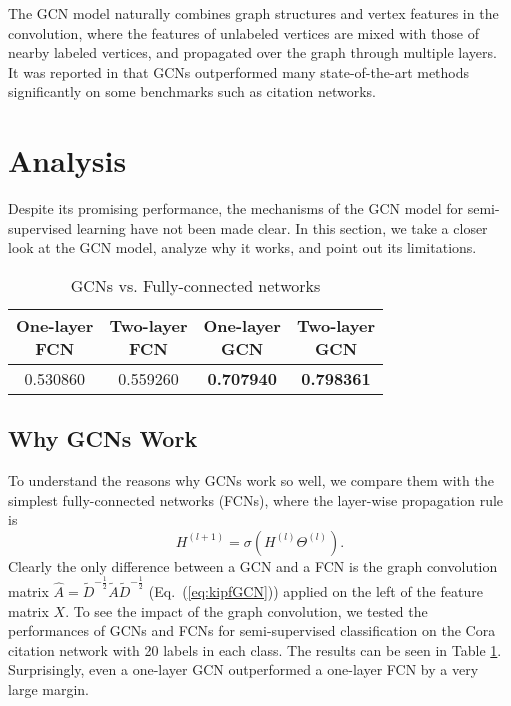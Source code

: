 \documentclass[letterpaper]{article} \usepackage{aaai18}  \usepackage{times}  \usepackage{helvet}  \usepackage{courier}  \usepackage{url}  \usepackage{graphicx}  \usepackage{algorithm}
\begin{document}
The GCN model naturally combines graph structures and vertex features in the convolution, where the features of unlabeled vertices are mixed with those of nearby labeled vertices, and propagated over the graph through multiple layers. It was reported in \cite{kipf2016semi} that GCNs outperformed many state-of-the-art methods significantly on some benchmarks such as citation networks.






\section{Analysis}\label{sec:Analysis}

Despite its promising performance, the mechanisms of the GCN model for semi-supervised learning have not been made clear. In this section, we take a closer look at the GCN model, analyze why it works, and point out its limitations.





\begin{table}
\centering
\caption{GCNs vs. Fully-connected networks}\label{tb:one_layer_gcn}
\begin{tabular}{cccc}
  \thead{ One-layer \\ FCN} & \thead{ Two-layer \\ FCN} & \thead{ One-layer \\ GCN} & \thead{ Two-layer \\ GCN}\\
  \midrule
   0.530860 &  0.559260 &  \textbf{0.707940} &  \textbf{0.798361}\\
\end{tabular}
\end{table}


\subsection{Why GCNs Work}

To understand the reasons why GCNs work so well, we compare them with the simplest fully-connected  networks (FCNs), where the layer-wise propagation rule is
\begin{equation}
H^{(l+1)} = \sigma \left( H^{(l)}\Theta^{(l)} \right ).
\end{equation}
Clearly the only difference between a GCN and a FCN is the graph convolution matrix $\hat{A}=\tilde{D}^{-\frac{1}{2}}\tilde{A}\tilde{D}^{-\frac{1}{2}}$ (Eq.~(\ref{eq:kipfGCN})) applied on the left of the feature matrix $X$. To see the impact of the graph convolution, we tested the performances of GCNs and FCNs for semi-supervised classification on the Cora citation network with 20 labels in each class. The results can be seen in Table \ref{tb:one_layer_gcn}. Surprisingly, even a one-layer GCN outperformed a one-layer FCN by a very large margin.
\end{document}
